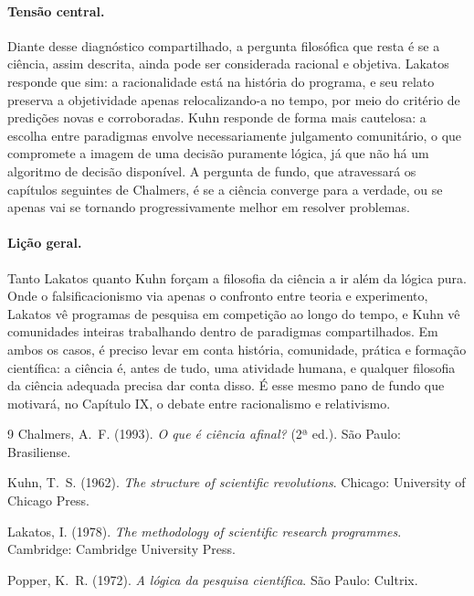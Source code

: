 \documentclass[9pt,a4paper]{extarticle}
\theoremstyle{definition}
\begin{document}
\paragraph{Tensão central.}
Diante desse diagnóstico compartilhado, a pergunta filosófica que resta é se a ciência, assim descrita, ainda pode ser considerada racional e objetiva. Lakatos responde que sim: a racionalidade está na história do programa, e seu relato preserva a objetividade apenas relocalizando-a no tempo, por meio do critério de predições novas e corroboradas. Kuhn responde de forma mais cautelosa: a escolha entre paradigmas envolve necessariamente julgamento comunitário, o que compromete a imagem de uma decisão puramente lógica, já que não há um algoritmo de decisão disponível. A pergunta de fundo, que atravessará os capítulos seguintes de Chalmers, é se a ciência converge para a verdade, ou se apenas vai se tornando progressivamente melhor em resolver problemas.

\paragraph{Lição geral.}
Tanto Lakatos quanto Kuhn forçam a filosofia da ciência a ir além da lógica pura. Onde o falsificacionismo via apenas o confronto entre teoria e experimento, Lakatos vê programas de pesquisa em competição ao longo do tempo, e Kuhn vê comunidades inteiras trabalhando dentro de paradigmas compartilhados. Em ambos os casos, é preciso levar em conta história, comunidade, prática e formação científica: a ciência é, antes de tudo, uma atividade humana, e qualquer filosofia da ciência adequada precisa dar conta disso. É esse mesmo pano de fundo que motivará, no Capítulo IX, o debate entre racionalismo e relativismo.

\begin{thebibliography}{9}
Chalmers, A.\ F. (1993).
\newblock \emph{O que é ciência afinal?} (2ª ed.).
\newblock São Paulo: Brasiliense.

Kuhn, T.\ S. (1962).
\newblock \emph{The structure of scientific revolutions}.
\newblock Chicago: University of Chicago Press.

Lakatos, I. (1978).
\newblock \emph{The methodology of scientific research programmes}.
\newblock Cambridge: Cambridge University Press.

Popper, K.\ R. (1972).
\newblock \emph{A lógica da pesquisa científica}.
\newblock São Paulo: Cultrix.
\end{thebibliography}
\end{document}

